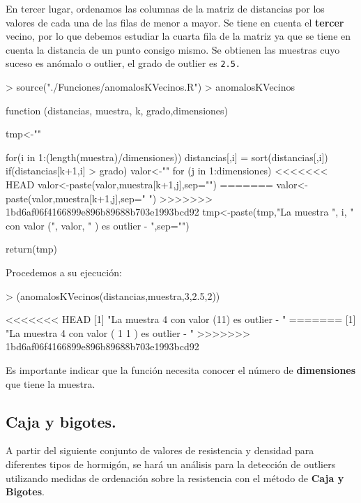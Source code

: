\documentclass [a4paper] {article}
\begin{document}
\bigskip
En tercer lugar, ordenamos las columnas de la matriz de distancias por los valores de cada una de
las filas de menor a mayor. Se tiene en cuenta el \textbf{tercer} vecino, por lo que debemos estudiar la cuarta 
fila de la matriz ya que se tiene en cuenta la distancia de un punto consigo mismo. Se obtienen las 
muestras cuyo suceso es anómalo o outlier, el grado de outlier es \texttt{2.5.}
\begin{Schunk}
\begin{Sinput}
> source("./Funciones/anomalosKVecinos.R")
> anomalosKVecinos
\end{Sinput}
\begin{Soutput}
function (distancias, muestra, k, grado,dimensiones) {
    tmp<-""

    for(i in 1:(length(muestra)/dimensiones)){
        distancias[,i] = sort(distancias[,i])
        if(distancias[k+1,i] > grado) {
            valor<-""
            for (j in 1:dimensiones){
<<<<<<< HEAD
                valor<-paste(valor,muestra[k+1,j],sep="")
=======
                valor<-paste(valor,muestra[k+1,j],sep=" ")
>>>>>>> 1bd6af06f4166899e896b89688b703e1993bcd92
            }
            tmp<-paste(tmp,"La muestra ", i, 
                " con valor (", valor, " ) es outlier - ",sep="")
        }
    }

    return(tmp)
}
\end{Soutput}
\end{Schunk}

\bigskip
Procedemos a su ejecución:
\begin{Schunk}
\begin{Sinput}
> (anomalosKVecinos(distancias,muestra,3,2.5,2))
\end{Sinput}
\begin{Soutput}
<<<<<<< HEAD
[1] "La muestra 4 con valor (11) es outlier - "
=======
[1] "La muestra 4 con valor ( 1 1 ) es outlier - "
>>>>>>> 1bd6af06f4166899e896b89688b703e1993bcd92
\end{Soutput}
\end{Schunk}

\bigskip
Es importante indicar que la función necesita conocer el número de \textbf{dimensiones} que tiene
la muestra.

\subsection{Caja y bigotes.}
\bigskip
A partir del siguiente conjunto de valores de resistencia y densidad para diferentes tipos de hormigón,
se hará un análisis para la detección de outliers utilizando medidas de ordenación sobre la resistencia
con el método de \textbf{Caja y Bigotes}.
\end{document}
